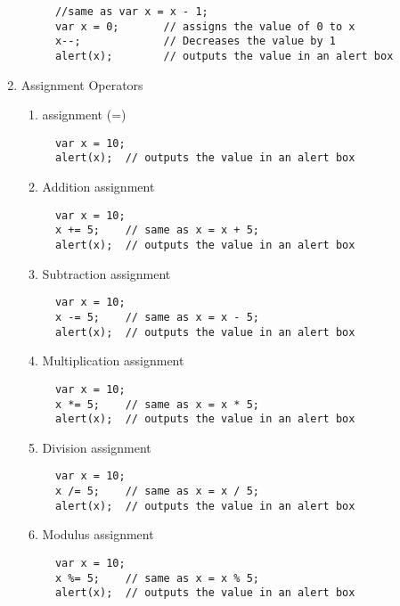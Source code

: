 \documentclass{article}
\begin{document}
\begin{enumerate}
\begin{enumerate}
\begin{lstlisting}
  //same as var x = x - 1;
  var x = 0;       // assigns the value of 0 to x
  x--;             // Decreases the value by 1
  alert(x);        // outputs the value in an alert box
\end{lstlisting}
\end{enumerate}
\item Assignment Operators
\begin{enumerate}
\item assignment (=)
\begin{lstlisting}
  var x = 10;
  alert(x);  // outputs the value in an alert box
\end{lstlisting}
\item Addition assignment
\begin{lstlisting}
  var x = 10;
  x += 5;    // same as x = x + 5;
  alert(x);  // outputs the value in an alert box
\end{lstlisting}
\item Subtraction assignment
\begin{lstlisting}
  var x = 10;
  x -= 5;    // same as x = x - 5;
  alert(x);  // outputs the value in an alert box
\end{lstlisting}
\item Multiplication assignment
\begin{lstlisting}
  var x = 10;
  x *= 5;    // same as x = x * 5;
  alert(x);  // outputs the value in an alert box
\end{lstlisting}
\item Division assignment
\begin{lstlisting}
  var x = 10;
  x /= 5;    // same as x = x / 5;
  alert(x);  // outputs the value in an alert box
\end{lstlisting}
\item Modulus assignment
\begin{lstlisting}
  var x = 10;
  x %= 5;    // same as x = x % 5;
  alert(x);  // outputs the value in an alert box
\end{lstlisting}
\end{enumerate}
\end{enumerate}
\end{document}
